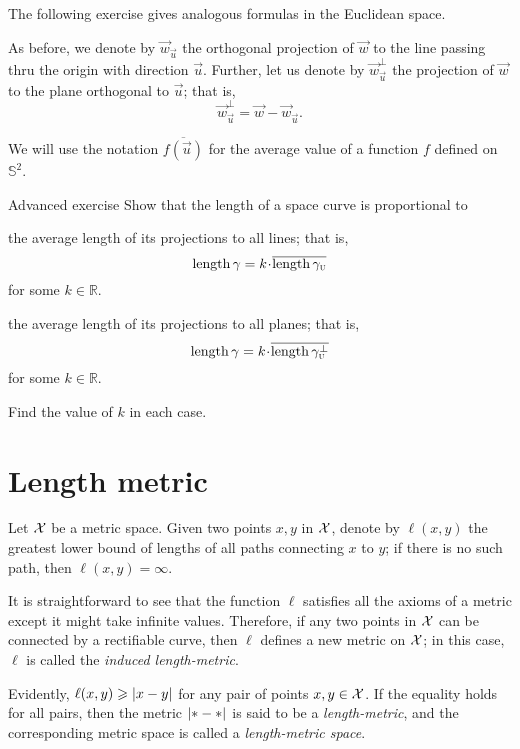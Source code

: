 The following exercise gives analogous formulas in the Euclidean space.

As before, we denote by $\vec w_{\vec u}$ the orthogonal projection of $\vec w$ to the line passing thru the origin with direction $\vec u$.
Further, let us denote by $\vec w_{\vec u}^\bot$ the projection of $\vec w$ to the plane orthogonal to $\vec u$;
that is,
\[\vec w_\vec u^\bot=\vec w - \vec w_{\vec u}.\]

We will use the notation 
$\overline{f(\vec u)}$ for the average value
of a function $f$ defined on $\mathbb{S}^2$.

\begin{thm}{Advanced exercise}\label{adex:more-croftons}
Show that the length of a space curve is proportional to 
\begin{subthm}{}
the average length of its projections to all lines; that is,
\[\length\gamma=k\cdot\overline{\length\gamma_{\vec u}}\]
for some $k \in \mathbb{R}$.
\end{subthm}
\begin{subthm}{}the average length of its projections to all planes; that is,
\[\length\gamma=k\cdot\overline{\length\gamma_{\vec u}^\bot}\]
for some $k \in \mathbb{R}$.
\end{subthm}
Find the value of $k$ in each case.
\end{thm}

\section{Length metric}\label{sec:Length metric}

Let $\mathcal{X}$ be a metric space.
Given two points $x,y$ in $\mathcal{X}$, denote by $\ell(x,y)$ the greatest lower bound of lengths of all paths connecting $x$ to $y$; if there is no such path, then $\ell(x,y)=\infty$.

It is straightforward to see that the function $\ell$ satisfies all the axioms of a metric except it might take infinite values.
Therefore, if any two points in $\mathcal{X}$ can be connected by a rectifiable curve, then $\ell$ defines a new metric on $\mathcal{X}$;
in this case, $\ell$ is called the \emph{induced length-metric}.

Evidently, $\ell(x,y)\ge \dist{x}{y}{}$ for any pair of points $x,y\in \mathcal{X}$.
If the equality holds for all pairs, then the metric $\dist{{*}}{{*}}{}$ is said to be a \emph{length-metric}, and the corresponding metric space is called a \index{}\emph{length-metric space}.


